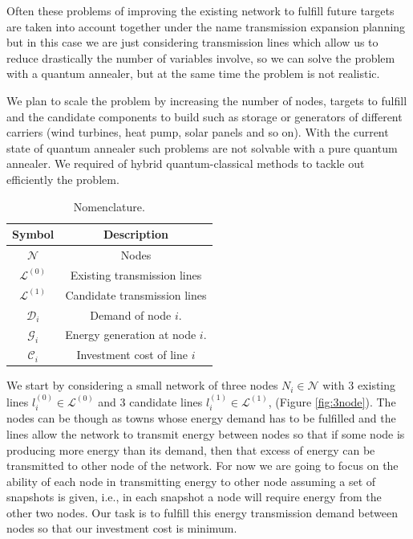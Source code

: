Often these problems of improving the existing network to fulfill future targets are taken into account together under the name transmission expansion planning but in this case we are just considering transmission lines which allow us to reduce drastically the number of variables involve, so we can solve the problem with a quantum annealer, but at the same time the problem is not realistic. \par
We plan to scale the problem by increasing the number of nodes, targets to fulfill and the candidate components to build such as storage or generators of different carriers (wind turbines, heat pump, solar panels and so on). With the current state of quantum annealer such problems are not solvable with a pure quantum annealer. We required of hybrid quantum-classical methods to tackle out efficiently the problem.
\newpage
\begin{table}
\centering
\begin{tabular}{cc} \\\toprule 
 \textbf{Symbol} & \textbf{Description} \\\midrule
 $\mathcal{N}$ & Nodes  \\\midrule
 $\mathcal{L}^{(0)}$ & Existing transmission lines  \\\midrule
 $\mathcal{L}^{(1)}$ & Candidate transmission lines \\\midrule
 $\mathcal{D}_{i}$ & Demand of node $i$. \\\midrule
 $\mathcal{G}_{i}$ & Energy generation at node $i$. \\\midrule
 $\mathcal{C}_{i}$ & Investment cost of line $i$ \\\bottomrule 
\end{tabular}
\caption{Nomenclature.}
\label{table:TEPNomenclature}
\end{table}
We start by considering a small network of three nodes $N_{i}\in \mathcal{N}$ with 3 existing lines $l_{i}^{(0)}\in \mathcal{L}^{(0)}$ and 3 candidate lines $l_{i}^{(1)}\in \mathcal{L}^{(1)}$, (Figure \ref{fig:3node}). The nodes can be though as towns whose energy demand has to be fulfilled and the lines allow the network to transmit energy between nodes so that if some node is producing more energy than its demand, then that excess of energy can be transmitted to other node of the network. For now we are going to focus on the ability of each node in transmitting energy to other node assuming a set of snapshots is given, i.e., in each snapshot a node will require energy from the other two nodes. Our task is to fulfill this energy transmission demand between nodes so that our investment cost is minimum.

